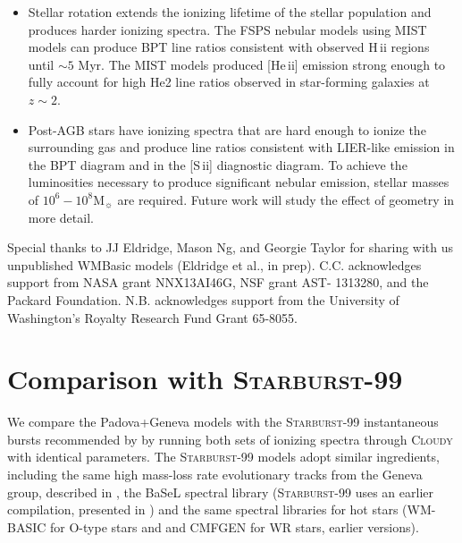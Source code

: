 \documentclass[twocolumn, tighten]{aastex61}
\newcommand{\FSPS}{{\sc FSPS}\xspace}
\newcommand{\SB}{\textsc{Starburst-99}\xspace}
\newcommand{\Cloudy}{\textsc{Cloudy}\xspace}
\newcommand{\sii}{[S\,{\sc ii}]\xspace}
\newcommand{\heii}{[He\,{\sc ii}]\xspace}
\newcommand\Msun{\ensuremath{\mathrm{M_{\sun}}}}
\newcommand{\hii}{H\,{\sc ii}\xspace}
\begin{document}
\begin{itemize}
\item Stellar rotation extends the ionizing lifetime of the stellar population and produces harder ionizing spectra. The \FSPS nebular models using MIST models can produce BPT line ratios consistent with observed \hii regions until ${\sim}5$ Myr. The MIST models produced \heii emission strong enough to fully account for high He2 line ratios observed in star-forming galaxies at $z{\sim}2$.
\item Post-AGB stars have ionizing spectra that are hard enough to ionize the surrounding gas and produce line ratios consistent with LIER-like emission in the BPT diagram and in the \sii{} diagnostic diagram. To achieve the luminosities necessary to produce significant nebular emission, stellar masses of $10^6-10^8\Msun$ are required. Future work will study the effect of geometry in more detail.
\end{itemize}

\acknowledgments

Special thanks to JJ Eldridge, Mason Ng, and Georgie Taylor for sharing with us unpublished WMBasic models (Eldridge et al., in prep). C.C. acknowledges support from NASA grant NNX13AI46G, NSF grant AST- 1313280, and the Packard Foundation. N.B. acknowledges support from the University of Washington's Royalty Research Fund Grant 65-8055.


\newpage

\appendix

\section{Comparison with \SB}\label{sec:appendix:B}

We compare the Padova+Geneva models with the \SB{} instantaneous bursts recommended by \citet{Levesque10} by running both sets of ionizing spectra through \Cloudy with identical parameters. The \SB{} models adopt similar ingredients, including the same high mass-loss rate evolutionary tracks from the Geneva group, described in \citet{Meynet00}, the BaSeL spectral library (\SB uses an earlier compilation, presented in \citet{Lejeune}) and the same spectral libraries for hot stars (WM-BASIC for O-type stars and and CMFGEN for WR stars, earlier versions).
\end{document}
